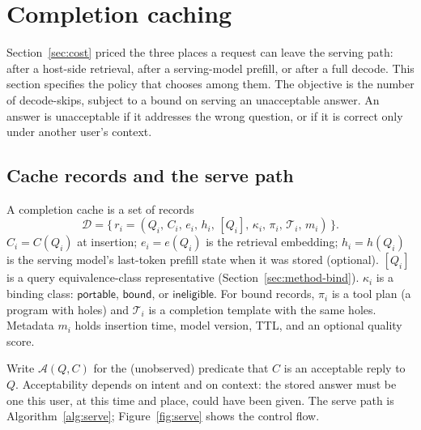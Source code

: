 \section{Completion caching}
\label{sec:method}

Section~\ref{sec:cost} priced the three places a request can leave the serving path: after a host-side retrieval, after a serving-model prefill, or after a full decode. This section specifies the policy that chooses among them. The objective is the number of decode-skips, subject to a bound on serving an unacceptable answer. An answer is unacceptable if it addresses the wrong question, or if it is correct only under another user's context.

\subsection{Cache records and the serve path}
\label{sec:method-serve}

A completion cache is a set of records
\[
\mathcal{D}
  = \bigl\{\, r_i = (Q_i,\, C_i,\, e_i,\, h_i,\, [Q_i],\, \kappa_i,\, \pi_i,\, \mathcal{T}_i,\, m_i) \,\bigr\}.
\]
$C_i=C(Q_i)$ at insertion; $e_i=e(Q_i)$ is the retrieval embedding; $h_i=h(Q_i)$ is the serving model's last-token prefill state when it was stored (optional). $[Q_i]$ is a query equivalence-class representative (Section~\ref{sec:method-bind}). $\kappa_i$ is a binding class: $\mathsf{portable}$, $\mathsf{bound}$, or $\mathsf{ineligible}$. For bound records, $\pi_i$ is a tool plan (a program with holes) and $\mathcal{T}_i$ is a completion template with the same holes. Metadata $m_i$ holds insertion time, model version, TTL, and an optional quality score.

Write $\mathcal{A}(Q,C)$ for the (unobserved) predicate that $C$ is an acceptable reply to $Q$. Acceptability depends on intent and on context: the stored answer must be one this user, at this time and place, could have been given. The serve path is Algorithm~\ref{alg:serve}; Figure~\ref{fig:serve} shows the control flow.


